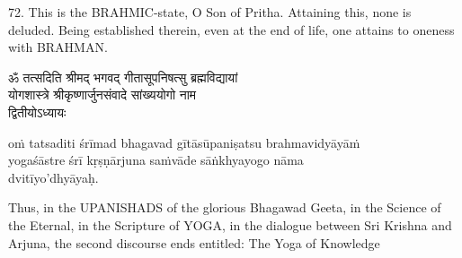 72. This is the BRAHMIC-state, O Son of Pritha. Attaining this, none is
deluded. Being established therein, even at the end of life, one attains to
oneness with BRAHMAN.\@

\begin{gitaverse}
ॐ तत्सदिति श्रीमद् भगवद् गीतासूपनिषत्सु ब्रह्मविद्यायां \\
योगशास्त्रे श्रीकृष्णार्जुनसंवादे सांख्ययोगो नाम \\
द्वितीयोऽध्यायः
\end{gitaverse}

\begin{transliteration}
oṁ tatsaditi śrīmad bhagavad gītāsūpaniṣatsu brahmavidyāyāṁ \\
yogaśāstre śrī kṛṣṇārjuna saṁvāde sāṅkhyayogo nāma \\
dvitīyo'dhyāyaḥ.
\end{transliteration}

Thus, in the UPANISHADS of the glorious Bhagawad Geeta, in the Science of the
Eternal, in the Scripture of YOGA, in the dialogue between Sri Krishna and
Arjuna, the second discourse ends entitled: The Yoga of Knowledge
